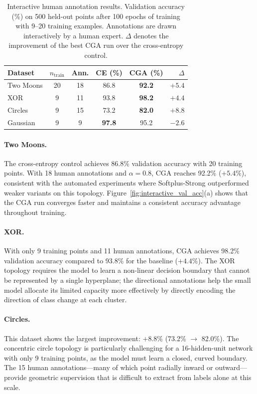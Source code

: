 \begin{table}[h]
\centering
\caption{Interactive human annotation results. Validation accuracy (\%) on 500 held-out points after 100 epochs of training with 9--20 training examples. Annotations are drawn interactively by a human expert. $\Delta$ denotes the improvement of the best CGA run over the cross-entropy control.}
\label{tab:interactive_results}
\begin{tabular}{lccccr}
\toprule
\textbf{Dataset} & $n_{\text{train}}$ & \textbf{Ann.} & \textbf{CE (\%)} & \textbf{CGA (\%)} & $\Delta$ \\
\midrule
Two Moons & 20 & 18 & 86.8 & \textbf{92.2} & $+5.4$ \\
XOR       &  9 & 11 & 93.8 & \textbf{98.2} & $+4.4$ \\
Circles   &  9 & 15 & 73.2 & \textbf{82.0} & $+8.8$ \\
Gaussian  &  9 &  9 & \textbf{97.8} & 95.2 & $-2.6$ \\
\bottomrule
\end{tabular}
\end{table}

\paragraph{Two Moons.}
The cross-entropy control achieves 86.8\% validation accuracy with 20 training points. With 18 human annotations and $\alpha=0.8$, CGA reaches 92.2\% ($+5.4\%$), consistent with the automated experiments where Softplus-Strong outperformed weaker variants on this topology. Figure~\ref{fig:interactive_val_acc}(a) shows that the CGA run converges faster and maintains a consistent accuracy advantage throughout training.

\paragraph{XOR.}
With only 9 training points and 11 human annotations, CGA achieves 98.2\% validation accuracy compared to 93.8\% for the baseline ($+4.4\%$). The XOR topology requires the model to learn a non-linear decision boundary that cannot be represented by a single hyperplane; the directional annotations help the small model allocate its limited capacity more effectively by directly encoding the direction of class change at each cluster.

\paragraph{Circles.}
This dataset shows the largest improvement: $+8.8\%$ (73.2\% $\to$ 82.0\%). The concentric circle topology is particularly challenging for a 16-hidden-unit network with only 9 training points, as the model must learn a closed, curved boundary. The 15 human annotations---many of which point radially inward or outward---provide geometric supervision that is difficult to extract from labels alone at this scale.


